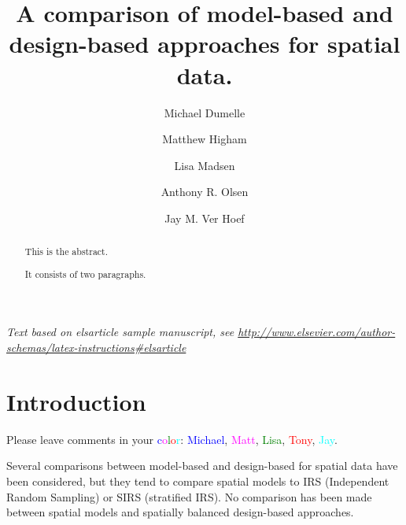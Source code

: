 \documentclass[]{elsarticle} %
\begin{document}
\begin{frontmatter}

  \title{A comparison of model-based and design-based approaches for spatial
data.}
    \author[USEPA]{Michael Dumelle}
    \author[STLAW]{Matthew Higham}
    \author[OSU]{Lisa Madsen}
  
    \author[USEPA]{Anthony R. Olsen}
  
    \author[NOAA]{Jay M. Ver Hoef}
  
      \address[USEPA]{United States Environmental Protection Agency, 200 SW 35th St,
Corvallis, Oregon, 97333}
    \address[STLAW]{Saint Lawrence University Department of Math, Computer Science, and
Statistics, 23 Romoda Drive, Canton, New York, 13617}
    \address[OSU]{Oregon State University Department of Statistics, 239 Weniger Hall,
Corvallis, Oregon, 97331}
    \address[NOAA]{Marine Mammal Laboratory, Alaska Fisheries Science Center, National
Oceanic and Atmospheric Administration, Seattle, Washington, 98115}
  
  \begin{abstract}
  This is the abstract.
  
  It consists of two paragraphs.
  \end{abstract}
  
 \end{frontmatter}

\emph{Text based on elsarticle sample manuscript, see
\url{http://www.elsevier.com/author-schemas/latex-instructions\#elsarticle}}

\hypertarget{introduction}{%
\section{Introduction}\label{introduction}}

Please leave comments in your
\textcolor{blue}{c}\textcolor{magenta}{o}\textcolor{green}{l}\textcolor{red}{o}\textcolor{cyan}{r}:
\textcolor{blue}{Michael}, \textcolor{magenta}{Matt},
\textcolor{green}{Lisa}, \textcolor{red}{Tony}, \textcolor{cyan}{Jay}.

Several comparisons between model-based and design-based for spatial
data have been considered, but they tend to compare spatial models to
IRS (Independent Random Sampling) or SIRS (stratified IRS). No
comparison has been made between spatial models and spatially balanced
design-based approaches.
\end{document}
